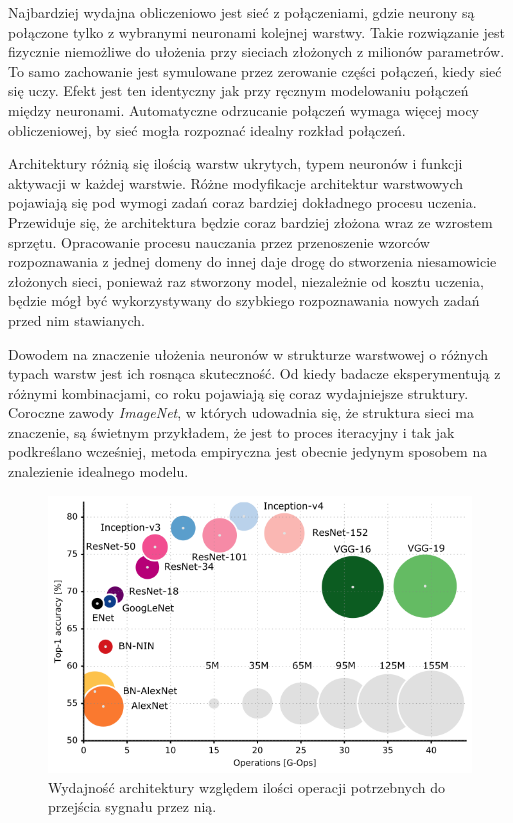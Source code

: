 \documentclass[12pt,a4paper,twoside,titlepage,openright]{book}
\begin{document}
\begin{itemize}
\begin{itemize}
Najbardziej wydajna obliczeniowo jest sieć z połączeniami, gdzie neurony są połączone tylko z wybranymi neuronami kolejnej warstwy. Takie rozwiązanie jest fizycznie niemożliwe do ułożenia przy sieciach złożonych z milionów parametrów. To samo zachowanie jest symulowane przez zerowanie części połączeń, kiedy sieć się uczy. Efekt jest ten identyczny jak przy ręcznym modelowaniu połączeń między neuronami. Automatyczne odrzucanie połączeń wymaga więcej mocy obliczeniowej, by sieć mogła rozpoznać idealny rozkład połączeń.

Architektury różnią się ilością warstw ukrytych, typem neuronów i funkcji aktywacji w każdej warstwie.
Różne modyfikacje architektur warstwowych pojawiają się pod wymogi zadań coraz bardziej dokładnego procesu uczenia. Przewiduje się, że architektura będzie coraz bardziej złożona wraz ze wzrostem sprzętu. Opracowanie procesu nauczania przez przenoszenie wzorców rozpoznawania z jednej domeny do innej daje drogę do stworzenia niesamowicie złożonych sieci, ponieważ raz stworzony model, niezależnie od kosztu uczenia, będzie mógł być wykorzystywany do szybkiego rozpoznawania nowych zadań przed nim stawianych.

Dowodem na znaczenie ułożenia neuronów w strukturze warstwowej o różnych typach warstw jest ich rosnąca skuteczność. Od kiedy badacze eksperymentują z różnymi kombinacjami, co roku pojawiają się coraz wydajniejsze struktury. Coroczne zawody \textit{ImageNet}, w których udowadnia się, że struktura sieci ma znaczenie, są świetnym przykładem, że jest to proces iteracyjny i tak jak podkreślano wcześniej, metoda empiryczna jest obecnie jedynym sposobem na znalezienie idealnego modelu.

\begin{figure}[h]
	\centering
			\includegraphics[resolution=100, scale=0.6]{architecturePerformance.png}
		\caption{Wydajność architektury względem ilości operacji potrzebnych do przejścia sygnału przez nią.}
\end{figure}



\end{itemize}
\end{itemize}
\end{document}

